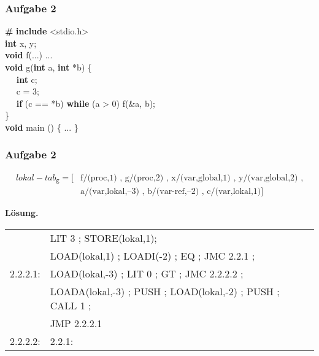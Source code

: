 \documentclass[aspectratio=1610,onlymath, ngerman]{beamer}
\renewcommand{\emph}[1]{\textbf{#1}}
\newcommand*{\tw}{\rowfont{\ttfamily}}
\begin{document}
	\begin{frame} \frametitle{Aufgabe 2}
	\small
		\begin{ttfamily}
			\emph{\#} \!\!\!\!\!\! \emph{include} <stdio.h> \\ 
			\emph{int} x, y; \\ \medskip
			\emph{void} f(...) {...} \\ \medskip
			\emph{void} g(\emph{int} a, \emph{int} *b) \{ \\
			$\quad$	\emph{int} c; \\
			$\quad$	c = 3; \\
			$\quad$	\emph{if} (c == *b) \emph{while} (a > 0) f(\&a, b); \\
			\} \\ \medskip
			\emph{void} main () \{ ... \} \\
		\end{ttfamily}
	\end{frame}

	\begin{frame} \frametitle{Aufgabe 2}
	\small 
		
		\begin{equation*}
			\begin{aligned}
			lokal-tab_{\texttt{g}} = [&\text{f/(proc,1) , g/(proc,2) , x/(var,global,1) , y/(var,global,2) ,} \\
				&\text{a/(var,lokal,--3) , b/(var-ref,--2) , c/(var,lokal,1)}]
			\end{aligned}
		\end{equation*}
		
		\bigskip 
		\pause
		\emph{Lösung.}
		
		\medskip 
		
		\begin{tabu}{rl}
			\tw &LIT 3 ; STORE(lokal,1); \\
			\tw &LOAD(lokal,1) ; LOADI(-2) ; EQ ; JMC 2.2.1 ; \\
			\tw 2.2.2.1: & LOAD(lokal,-3) ; LIT 0 ; GT ; JMC 2.2.2.2 ; \\
			\tw & LOADA(lokal,-3) ; PUSH ; LOAD(lokal,-2) ; PUSH ; CALL 1 ; \\
			\tw & JMP 2.2.2.1 \\
			\tw 2.2.2.2: & 2.2.1:
		\end{tabu}
	\end{frame}
	
\end{document}
